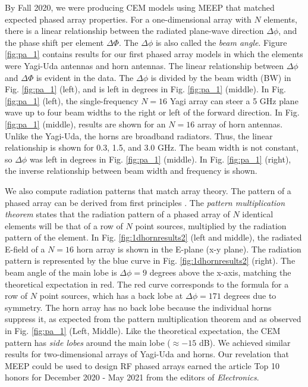 \documentclass[11pt]{amsart}
\begin{document}
By Fall 2020, we were producing CEM models using MEEP that matched expected phased array properties.  For a one-dimensional array with $N$ elements, there is a linear relationship between the radiated plane-wave direction $\Delta \phi$, and the phase shift per element $\Delta \Phi$.  The $\Delta \phi$ is also called the \textit{beam angle}.  Figure \ref{fig:pa_1} contains results for our first phased array models in which the elements were Yagi-Uda antennas and horn antennas.  The linear relationship between $\Delta \phi$ and $\Delta \Phi$ is evident in the data.  The $\Delta \phi$ is divided by the beam width (BW) in Fig. \ref{fig:pa_1} (left), and is left in degrees in Fig. \ref{fig:pa_1} (middle).  In Fig. \ref{fig:pa_1} (left), the single-frequency $N=16$ Yagi array can steer a 5 GHz plane wave up to four beam widths to the right or left of the forward direction.  In Fig. \ref{fig:pa_1} (middle), results are shown for an $N=16$ array of horn antennas.  Unlike the Yagi-Uda, the horns are broadband radiators.  Thus, the linear relationship is shown for 0.3, 1.5, and 3.0 GHz.  The beam width is not constant, so $\Delta \phi$ was left in degrees in Fig. \ref{fig:pa_1} (middle).  In Fig. \ref{fig:pa_1} (right), the inverse relationship between beam width and frequency is shown. 

We also compute radiation patterns that match array theory.  The pattern of a phased array can be derived from first principles \cite{electronics10040415}.  The \textit{pattern multiplication theorem} states that the radiation pattern of a phased array of $N$ identical elements will be that of a row of $N$ point sources, multiplied by the radiation pattern of the element.  In Fig. \ref{fig:1dhornresults2} (left and middle), the radiated E-field of a $N=16$ horn array is shown in the E-plane (x-y plane).  The radiation pattern is represented by the blue curve in Fig. \ref{fig:1dhornresults2} (right).  The beam angle of the main lobe is $\Delta \phi = 9$ degrees above the x-axis, matching the theoretical expectation in red.  The red curve corresponds to the formula for a row of $N$ point sources, which has a back lobe at $\Delta \phi = 171$ degrees due to symmetry.  The horn array has no back lobe because the individual horns suppress it, as expected from the pattern multiplication theorem and as observed in Fig. \ref{fig:pa_1} (Left, Middle).  Like the theoretical expectation, the CEM pattern has \textit{side lobes} around the main lobe ($\approx -15$ dB).  We achieved similar results for two-dimensional arrays of Yagi-Uda and horns.  Our revelation that MEEP could be used to design RF phased arrays earned the article Top 10 honors for December 2020 - May 2021 from the editors of \textit{Electronics}. 
\end{document}
